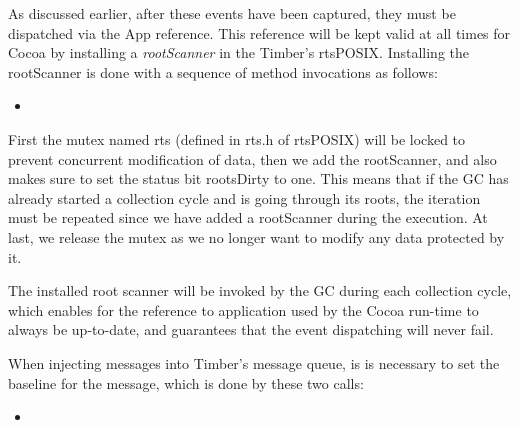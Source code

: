 \documentclass[a4paper]{article}
\newcommand{\ccode}[2]
  {\begin{itemize}\item[]\end{itemize}}
\begin{document}
As discussed earlier, after these events have been captured, they must be dispatched via the App reference. This reference will be kept valid at all times for Cocoa by installing a \textit{rootScanner} in the Timber's rtsPOSIX. Installing the rootScanner is done with a sequence of method invocations as follows:

\ccode{rootScanner}{}

First the mutex named rts (defined in rts.h of rtsPOSIX) will be locked to prevent concurrent modification of data, then we add the rootScanner, and also makes sure to set the status bit rootsDirty to one. This means that if the GC has already started a collection cycle and is going through its roots, the iteration must be repeated since we have added a rootScanner during the execution. At last, we release the mutex as we no longer want to modify any data protected by it.

The installed root scanner will be invoked by the GC during each collection cycle, which enables for the reference to application used by the Cocoa run-time to always be up-to-date, and guarantees that the event dispatching will never fail.

When injecting messages into Timber's message queue, is is necessary to set the baseline for the message, which is done by these two calls:

\ccode{rootScanner2}{}
\end{document}
